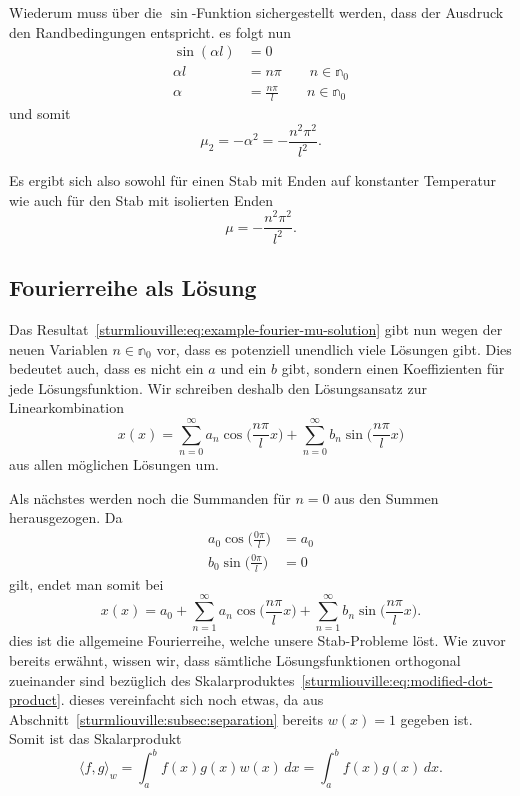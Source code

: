 Wiederum muss über die $\sin$-Funktion sichergestellt werden, dass der
Ausdruck den Randbedingungen entspricht.
es folgt nun
\[
\begin{aligned}
    \sin(\alpha l) &= 0 \\
    \alpha l &= n \pi \qquad n \in \mathbb{n}_0 \\
    \alpha &= \frac{n \pi}{l} \qquad n \in \mathbb{n}_0
\end{aligned}
\]
und somit
\[
    \mu_2 = -\alpha^{2} = -\frac{n^{2}\pi^{2}}{l^{2}}.
\]

Es ergibt sich also sowohl für einen Stab mit Enden auf konstanter Temperatur
wie auch für den Stab mit isolierten Enden
\begin{equation}
    \label{sturmliouville:eq:example-fourier-mu-solution}
    \mu
    =
    -\frac{n^{2}\pi^{2}}{l^{2}}.
\end{equation}

\subsection{Fourierreihe als Lösung}
Das Resultat~\eqref{sturmliouville:eq:example-fourier-mu-solution} gibt nun
wegen der neuen Variablen $n \in \mathbb{n}_0$ vor, dass es potenziell
unendlich viele Lösungen gibt.
Dies bedeutet auch, dass es nicht ein $a$ und ein $b$ gibt, sondern einen
Koeffizienten für jede Lösungsfunktion.
Wir schreiben deshalb den Lösungsansatz zur Linearkombination
\[
    x(x)
    =
    \sum_{n = 0}^{\infty} a_n\cos\biggl(\frac{n\pi}{l}x\biggr)
    +
    \sum_{n = 0}^{\infty} b_n\sin\biggl(\frac{n\pi}{l}x\biggr)
\]
aus allen möglichen Lösungen um.

Als nächstes werden noch die Summanden für $n = 0$ aus den
Summen herausgezogen.
Da
\[
    \begin{aligned}
        a_0 \cos\biggl(\frac{0 \pi}{l}\biggr) &= a_0 \\
        b_0 \sin\biggl(\frac{0 \pi}{l}\biggr) &= 0
    \end{aligned}
\]
gilt, endet man somit bei
\[
    x(x)
    =
    a_0
    +
    \sum_{n = 1}^{\infty} a_n\cos\biggl(\frac{n\pi}{l}x\biggr)
    +
    \sum_{n = 1}^{\infty} b_n\sin\biggl(\frac{n\pi}{l}x\biggr).
\]
dies ist die allgemeine Fourierreihe, welche unsere Stab-Probleme löst.
Wie zuvor bereits erwähnt, wissen wir, dass sämtliche Lösungsfunktionen
orthogonal zueinander sind bezüglich des
Skalarproduktes~\eqref{sturmliouville:eq:modified-dot-product}.
dieses vereinfacht sich noch etwas, da aus
Abschnitt~\ref{sturmliouville:subsec:separation} bereits $w(x) = 1$ gegeben ist.
Somit ist das Skalarprodukt
\begin{equation}
    \label{sturmliouville:eq:example-fourier-dot-product}
    \langle f, g \rangle_w
    =
    \int_a^b f(x)g(x)w(x)\,dx
    =
    \int_a^b f(x)g(x)\,dx.
\end{equation}

